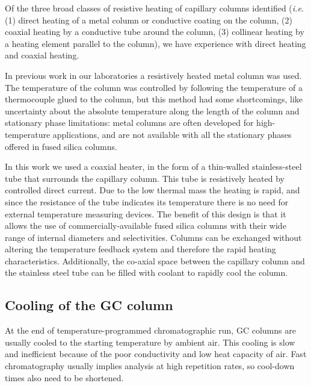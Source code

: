 \documentclass[aip,rsi,preprint,graphicx]{revtex4-1} %
\begin{document}


Of the three broad classes of resistive heating of capillary columns
identified\cite{Wang2012} (\textit{i.e.} (1) direct heating of a metal column or
conductive coating on the column, (2) coaxial heating by a conductive tube
around the column, (3) collinear heating by a heating element parallel to the
column), we have experience with direct heating and coaxial heating.

In previous work in our laboratories\cite*{Venter2004, Venter2006} a resistively
heated metal column was used. The temperature of the column was controlled by
following the temperature of a thermocouple glued to the column, but this method
had some shortcomings, like uncertainty about the absolute temperature along the
length of the column and stationary phase limitations: metal columns are often
developed for high-temperature applications, and are not available with
all the stationary phases offered in fused silica columns.


In this work we used a coaxial heater, in the form of a thin-walled
stainless-steel tube that surrounds the capillary column.  This tube is
resistively heated by controlled direct current. Due to the low thermal mass the
heating is rapid, and since the resistance of the tube indicates its temperature
there is no need for external temperature measuring devices. The benefit of this
design is that it allows the use of commercially-available fused silica columns
with their wide range of internal diameters and selectivities. Columns can be
exchanged without altering the temperature feedback system and therefore the
rapid heating characteristics. Additionally, the co-axial space between the
capillary column and the stainless steel tube can be filled with coolant to
rapidly cool the column.

\subsection{Cooling of the GC column}

At the end of temperature-programmed chromatographic run, GC columns are usually
cooled to the starting temperature by ambient air. This cooling is slow and
inefficient because of the poor conductivity and low heat capacity of air. Fast
chromatography usually implies analysis at high repetition rates, so cool-down
times also need to be shortened. 
\end{document}
